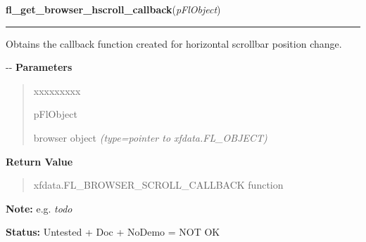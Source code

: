 \hspace{.8\funcindent}\begin{boxedminipage}{\funcwidth}

    \raggedright \textbf{fl\_get\_browser\_hscroll\_callback}(\textit{pFlObject})

    \vspace{-1.5ex}

    \rule{\textwidth}{0.5\fboxrule}
\setlength{\parskip}{2ex}

Obtains the callback function created for horizontal scrollbar position
change.

-{}-
\setlength{\parskip}{1ex}
      \textbf{Parameters}
      \vspace{-1ex}

      \begin{quote}
        \begin{Ventry}{xxxxxxxxx}

          \item[pFlObject]


browser object
            {\it (type=pointer to xfdata.FL\_OBJECT)}

        \end{Ventry}

      \end{quote}

      \textbf{Return Value}
    \vspace{-1ex}

      \begin{quote}

xfdata.FL\_BROWSER\_SCROLL\_CALLBACK function
      \end{quote}

\textbf{Note:} 
e.g. \emph{todo}


\textbf{Status:} 
Untested + Doc + NoDemo = NOT OK


    \end{boxedminipage}

    \label{xformslib:flbrowser:fl_get_browser_vscroll_callback}

    \vspace{0.5ex}

